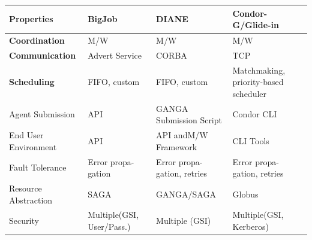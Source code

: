 \documentclass[conference]{IEEEtran}
\begin{document}
\begin{table}[t]
\footnotesize
\centering
\begin{tabular}{p{1.9cm}p{1.7cm}p{1.6cm}p{1.6cm}}
	\toprule
	\textbf{Properties}
	&\textbf{BigJob} &\textbf{DIANE} &\textbf{Condor-G/\newline Glide-in}    
	\\ \midrule

\textbf{Coordination} &M/W  &M/W &M/W \\ \midrule
	
\textbf{Communication} &Advert Service &CORBA &TCP\\ \midrule

\textbf{Scheduling} &FIFO, custom &FIFO, custom &Matchmaking, priority-based scheduler \\



\midrule
Agent Submission &API &GANGA Submission Script &Condor CLI 
\\

\midrule

End User Environment &API &API and\newline M/W Framework  &CLI Tools \\ 

\midrule

Fault Tolerance &Error propa-\newline gation &Error propa-\newline gation, retries &Error propa-\newline gation, retries \\

\midrule

Resource Abstraction &SAGA &GANGA/\newline SAGA &Globus \\ 

\midrule

Security &Multiple\newline (GSI, User/Pass.) &Multiple (GSI) &Multiple\newline (GSI, 
Kerberos) \\ 

\bottomrule



\end{tabular}
\end{table}
\end{document}
